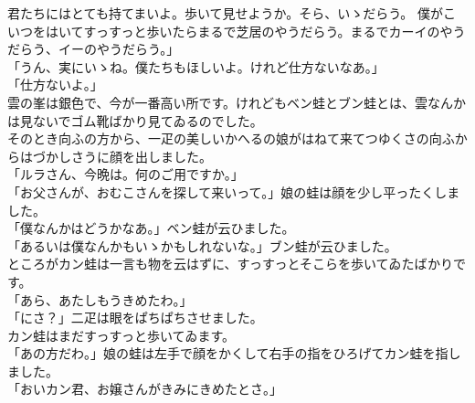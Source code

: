 \documentclass[
a4paper,
10pt,
book]
{tarticle}
\begin{document}
\begin{linenumbers}
    \noindent 君たちにはとても持てまいよ。歩いて見せようか。そら、いゝだらう。
    僕がこいつをはいてすっすっと歩いたらまるで芝居のやうだらう。まるでカーイのやうだらう、イーのやうだらう。」\\
    「うん、実にいゝね。僕たちもほしいよ。けれど仕方ないなあ。」\\
    「仕方ないよ。」\\
    \indent 雲の峯は銀色で、今が一番高い所です。けれどもベン蛙とブン蛙とは、雲なんかは見ないでゴム靴ばかり見てゐるのでした。\\
    \indent そのとき向ふの方から、一疋の美しいかへるの娘がはねて来てつゆくさの向ふからはづかしさうに顔を出しました。\\
    「ルラさん、今晩は。何のご用ですか。」\\
    「お父さんが、おむこさんを探して来いって。」娘の蛙は顔を少し平ったくしました。\\
    「僕なんかはどうかなあ。」ベン蛙が云ひました。\\
    「あるいは僕なんかもいゝかもしれないな。」ブン蛙が云ひました。\\
    \indent ところがカン蛙は一言も物を云はずに、すっすっとそこらを歩いてゐたばかりです。\\
    「あら、あたしもうきめたわ。」\\
    「にさ？」二疋は眼をぱちぱちさせました。\\
    \indent カン蛙はまだすっすっと歩いてゐます。\\
    「あの方だわ。」娘の蛙は左手で顔をかくして右手の指をひろげてカン蛙を指しました。\\
    「おいカン君、お嬢さんがきみにきめたとさ。」
\end{linenumbers}
\end{document}
